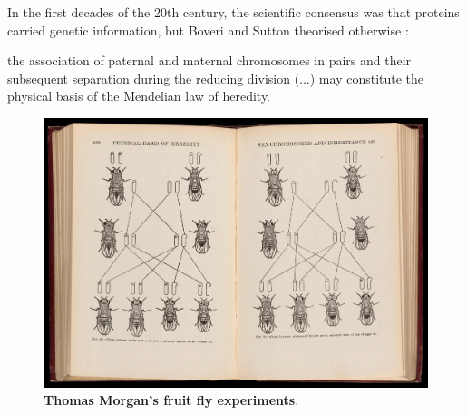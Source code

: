 


In the first decades of the 20th century, the scientific consensus was that proteins carried genetic information, but Boveri and Sutton theorised otherwise \cite{dahm:2005wx,sutton:1902tx}:

\begin{displayquote}
the association of paternal and maternal chromosomes in pairs and their subsequent separation during the reducing division (...) may constitute the physical basis of the Mendelian law of heredity.
\end{displayquote}


\begin{figure}
  \vspace{-\intextsep}
  \includegraphics[width=\linewidth]{images/intro/thomas-morgan-fly}
  \caption[Thomas Morgan's fruit fly experiments]{\textbf{Thomas Morgan's fruit fly experiments}.}
  \vspace{-\intextsep}
\end{figure}

